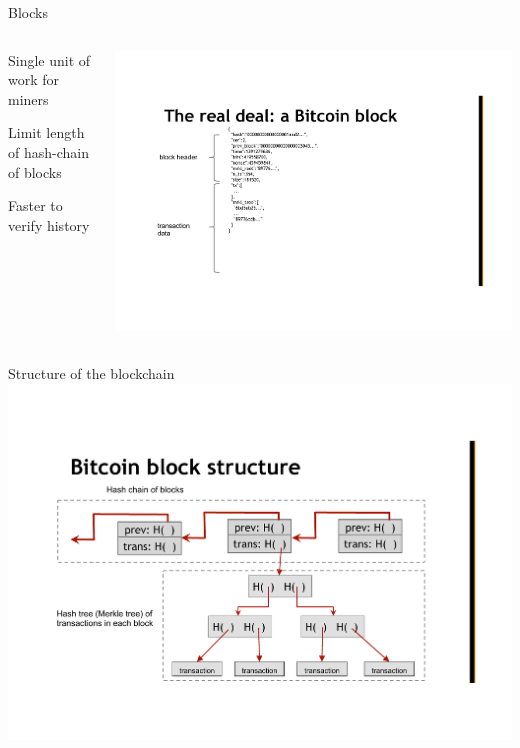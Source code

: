 \begin{frame}{Blocks}
	
\begin{columns}
\begin{column}{0.5\textwidth}
\BI
\item Single unit of work for miners
\item Limit length of hash-chain of blocks
\item Faster to verify history
\EI
\end{column}
\begin{column}{0.5\textwidth}
\includegraphics[width=\textwidth]{block}
\end{column}
\end{columns}


\end{frame}


\begin{frame}{Structure of the blockchain}
\includegraphics[width=\textwidth]{blockchain-actual}
\end{frame}

